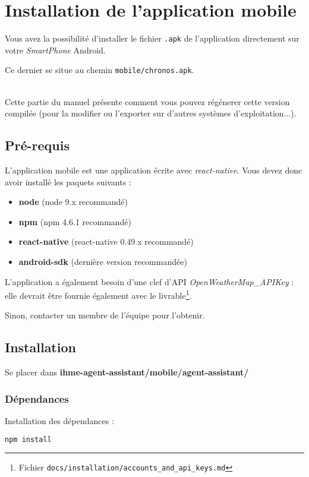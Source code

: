 \chapter{Installation de l'application mobile}

Vous avez la possibilité d'installer le fichier \texttt{.apk} de l'application directement sur votre \emph{SmartPhone} Android. 

Ce dernier se situe au chemin \texttt{mobile/chronos.apk}.

~\\\indent
Cette partie du manuel présente comment vous pouvez régénerer cette version compilée (pour la modifier ou l'exporter sur d'autres systèmes d'exploitation...).

\section{Pré-requis}
L'application mobile est une application écrite avec \emph{react-native}. Vous devez donc avoir installé les paquets suivants :
\begin{itemize}
\item \textbf{node} (node 9.x recommandé)
\item \textbf{npm} (npm 4.6.1 recommandé)
\item \textbf{react-native} (react-native 0.49.x recommandé)
\item \textbf{android-sdk} (dernière version recommandée)\\
\end{itemize}


L'application a également besoin d'une clef d'API \og \emph{OpenWeatherMap\_APIKey} \fg{} : elle devrait être fournie également avec le livrable\footnote{Fichier \texttt{docs/installation/accounts\_and\_api\_keys.md}}. 

Sinon, contacter un membre de l'équipe pour l'obtenir.

\section{Installation}

Se placer dans \textbf{ihme-agent-assistant/mobile/agent-assistant/}

\subsection{Dépendances}

Installation des dépendances :
\begin{lstlisting}[language=bash]
  npm install
\end{lstlisting}

